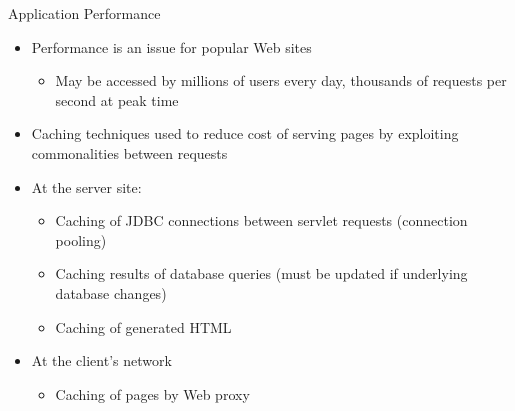 \documentclass[aspectratio=169, xcolor=dvipsnames]{beamer}
\begin{document}
\begin{frame}{Application Performance}
    \begin{itemize}[<+->]
        \item Performance is an issue for popular Web sites
        \begin{itemize}
            \item[$\triangleright$] May be accessed by millions of users every day, thousands of requests per second at peak time
        \end{itemize}
        \item Caching techniques used to reduce cost of serving pages by exploiting commonalities between requests
        \item At the server site:
        \begin{itemize}
            \item[$\triangleright$] Caching of JDBC connections between servlet requests (connection pooling)
            \item[$\triangleright$] Caching results of database queries (must be updated if underlying database changes)
            \item[$\triangleright$] Caching of generated HTML
        \end{itemize}
        \item At the client's network
        \begin{itemize}
            \item[$\triangleright$] Caching of pages by Web proxy
        \end{itemize}
    \end{itemize}
\end{frame}
\end{document}
